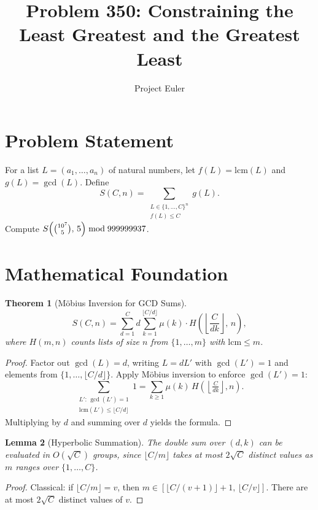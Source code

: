 \documentclass[a4paper,12pt]{article}
\title{Problem 350: Constraining the Least Greatest and the Greatest Least}
\author{Project Euler}
\date{}
\newtheorem{theorem}{Theorem}
\newtheorem{lemma}[theorem]{Lemma}
\begin{document}
\maketitle

\section{Problem Statement}
For a list $L = (a_1, \ldots, a_n)$ of natural numbers, let $f(L) = \mathrm{lcm}(L)$ and $g(L) = \gcd(L)$. Define
\[
S(C, n) = \sum_{\substack{L \in \{1,\ldots,C\}^n \\ f(L) \le C}} g(L).
\]
Compute $S\!\left(\tbinom{10^7}{5},\, 5\right) \bmod 999999937$.

\section{Mathematical Foundation}

\begin{theorem}[M\"obius Inversion for GCD Sums]
\[
S(C, n) = \sum_{d=1}^{C} d \sum_{k=1}^{\lfloor C/d \rfloor} \mu(k) \cdot H\!\left(\left\lfloor \frac{C}{dk} \right\rfloor,\, n\right),
\]
where $H(m, n)$ counts lists of size $n$ from $\{1, \ldots, m\}$ with $\mathrm{lcm} \le m$.
\end{theorem}

\begin{proof}
Factor out $\gcd(L) = d$, writing $L = dL'$ with $\gcd(L') = 1$ and elements from $\{1, \ldots, \lfloor C/d \rfloor\}$. Apply M\"obius inversion to enforce $\gcd(L') = 1$:
\[
\sum_{\substack{L':\,\gcd(L')=1 \\ \mathrm{lcm}(L') \le \lfloor C/d\rfloor}} 1 = \sum_{k \ge 1} \mu(k)\, H\!\left(\left\lfloor \tfrac{C}{dk}\right\rfloor, n\right).
\]
Multiplying by $d$ and summing over $d$ yields the formula.
\end{proof}

\begin{lemma}[Hyperbolic Summation]
The double sum over $(d,k)$ can be evaluated in $O(\sqrt{C})$ groups, since $\lfloor C/m \rfloor$ takes at most $2\sqrt{C}$ distinct values as $m$ ranges over $\{1, \ldots, C\}$.
\end{lemma}

\begin{proof}
Classical: if $\lfloor C/m \rfloor = v$, then $m \in [\lfloor C/(v+1)\rfloor + 1,\, \lfloor C/v \rfloor]$. There are at most $2\sqrt{C}$ distinct values of $v$.
\end{proof}
\end{document}
